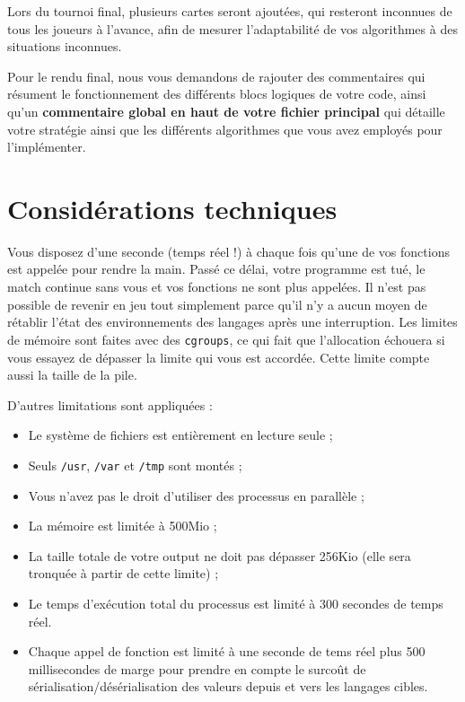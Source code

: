 Lors du tournoi final, plusieurs cartes seront ajoutées, qui resteront
inconnues de tous les joueurs à l'avance, afin de mesurer l'adaptabilité de
vos algorithmes à des situations inconnues.

Pour le rendu final, nous vous demandons de rajouter des commentaires qui
résument le fonctionnement des différents blocs logiques de votre code, ainsi
qu'un \textbf{commentaire global en haut de votre fichier principal} qui
détaille votre stratégie ainsi que les différents algorithmes que vous avez
employés pour l'implémenter.

\section{Considérations techniques}

Vous disposez d'une seconde (temps réel !) à chaque fois qu'une de vos
fonctions est appelée pour rendre la main. Passé ce délai, votre programme est
tué, le match continue sans vous et vos fonctions ne sont plus appelées. Il
n'est pas possible de revenir en jeu tout simplement parce qu'il n'y a aucun
moyen de rétablir l'état des environnements des langages après une
interruption.  Les limites de mémoire sont faites avec des \texttt{cgroups}, ce
qui fait que l'allocation échouera si vous essayez de dépasser la limite qui
vous est accordée. Cette limite compte aussi la taille de la pile.

D'autres limitations sont appliquées :

\begin{itemize}
    \item Le système de fichiers est entièrement en lecture seule ;
    \item Seuls \texttt{/usr}, \texttt{/var} et \texttt{/tmp} sont montés ;
    \item Vous n'avez pas le droit d'utiliser des processus en parallèle ;
    \item La mémoire est limitée à 500Mio ;
    \item La taille totale de votre output ne doit pas dépasser 256Kio (elle
        sera tronquée à partir de cette limite) ;
    \item Le temps d'exécution total du processus est limité à 300 secondes de
        temps réel.
    \item Chaque appel de fonction est limité à une seconde de tems réel plus
        500 millisecondes de marge pour prendre en compte le surcoût de
        sérialisation/désérialisation des valeurs depuis et vers les langages
        cibles.
\end{itemize}
